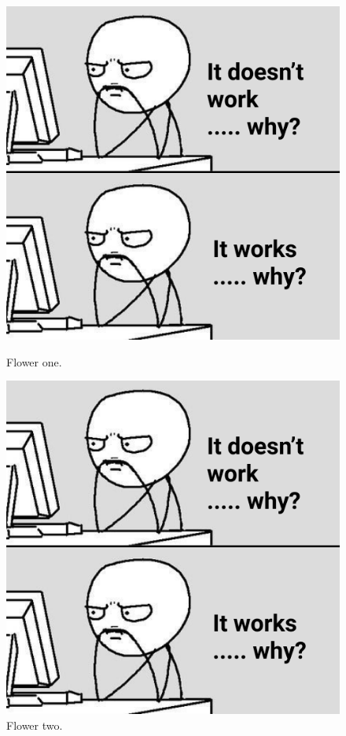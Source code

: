 \documentclass[12pt]{article}
\begin{document}
\begin{figure}[H]
  \centering
  \begin{minipage}[b]{0.4\textwidth}
    \includegraphics[width=\textwidth]{img}
    \caption{Flower one.}
  \end{minipage}
  \hfill
  \begin{minipage}[b]{0.4\textwidth}
    \includegraphics[width=\textwidth]{img}
    \caption{Flower two.}
  \end{minipage}
  \label{figure:two-beside}
\end{figure}
\end{document}
